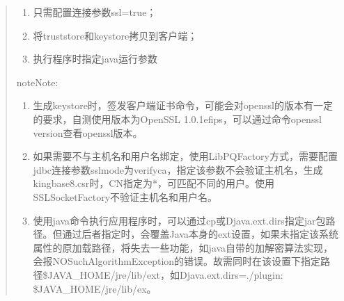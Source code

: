 \documentclass[a4,10pt,oneside,english]{sphinxmanual}
\begin{document}
\begin{quote}
\begin{enumerate}
%
\item {} 
只需配置连接参数ssl=true；

\item {} 
将truststore和keystore拷贝到客户端；

\item {} 
执行程序时指定java运行参数

\end{enumerate}

\begin{sphinxVerbatim}[commandchars=\\\{\}]
 
 
\end{sphinxVerbatim}

\begin{sphinxadmonition}{note}{Note:}\begin{enumerate}
%
\item {} 
生成keystore时，签发客户端证书命令，可能会对openssl的版本有一定的要求，自测使用版本为OpenSSL 1.0.1e\sphinxhyphen{}fips，可以通过命令openssl version查看openssl版本。

\item {} 
如果需要不与主机名和用户名绑定，使用LibPQFactory方式，需要配置jdbc连接参数sslmode为verify\sphinxhyphen{}ca，指定该参数不会验证主机名，生成kingbase8.csr时，CN指定为*，可匹配不同的用户。使用SSLSocketFactory不验证主机名和用户名。

\item {} 
使用java命令执行应用程序时，可以通过\sphinxhyphen{}cp或\sphinxhyphen{}Djava.ext.dirs指定jar包路径。但通过后者指定时，会覆盖Java本身的ext设置，如果未指定该系统属性的原加载路径，将失去一些功能，如java自带的加解密算法实现，会报NOSuchAlgorithmException的错误。故需同时在该设置下指定路径\$JAVA\_HOME/jre/lib/ext，如\sphinxhyphen{}Djava.ext.dirs=./plugin: \$JAVA\_HOME/jre/lib/ex。


\end{enumerate}
\end{sphinxadmonition}
\end{quote}
\end{document}
